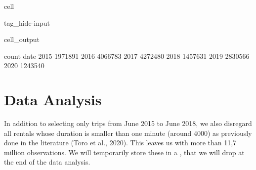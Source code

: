 \documentclass[letterpaper,10pt,english]{jupyterBook}
\begin{document}
\begin{sphinxuseclass}{cell}
\begin{sphinxuseclass}{tag_hide-input}
\begin{sphinxuseclass}{cell_output}
\begin{sphinxVerbatim}[commandchars=\\\{\}]
        count
date         
2015  1971891
2016  4066783
2017  4272480
2018  1457631
2019  2830566
2020  1243540
\end{sphinxVerbatim}

\end{sphinxuseclass}
\end{sphinxuseclass}
\end{sphinxuseclass}

\section{Data Analysis}
\label{\detokenize{03-data_ingestion_and_spatial_operations:data-analysis}}
\sphinxAtStartPar
In addition to selecting only trips from June 2015 to June 2018, we also disregard all rentals whose duration is smaller than one minute (around 4000) \sphinxhyphen{} as previously done in the literature (Toro et al., 2020). This leaves us with more than 11,7 million observations. We will temporarily store these in a , that we will drop at the end of the data analysis.
\end{document}
